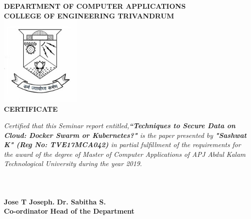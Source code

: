 
\begin{titlepage}
\begin{center}
\textbf{DEPARTMENT OF COMPUTER APPLICATIONS}\\[0.5cm]
\textbf{ COLLEGE OF ENGINEERING TRIVANDRUM}\\
[0.5cm]
\vspace{1.2cm}
\includegraphics[width=0.30\textwidth]{1-title/images/cet.jpg}\\
\vspace{0.8cm}
\textbf{CERTIFICATE}\\
\end{center}
\emph{Certified that this Seminar report entitled,\textbf{``Techniques to Secure Data on Cloud: Docker Swarm or Kubernetes?"} is the paper presented by \textbf{"Sashwat K" (Reg No: TVE17MCA042)} in partial fulfillment of the requirements for the award of the degree of Master of Computer Applications of APJ Abdul Kalam Technological University during the year 2019.}\\\\\\\\
\vspace{0.9cm}
\textbf{Jose T Joseph.}
\hspace{9.3cm}
\textbf{Dr. Sabitha S.}\\ 
\hspace{5cm}
 \textbf{Co-ordinator}
\hspace{9cm}
\textbf{Head of the Department}

\end{titlepage}
